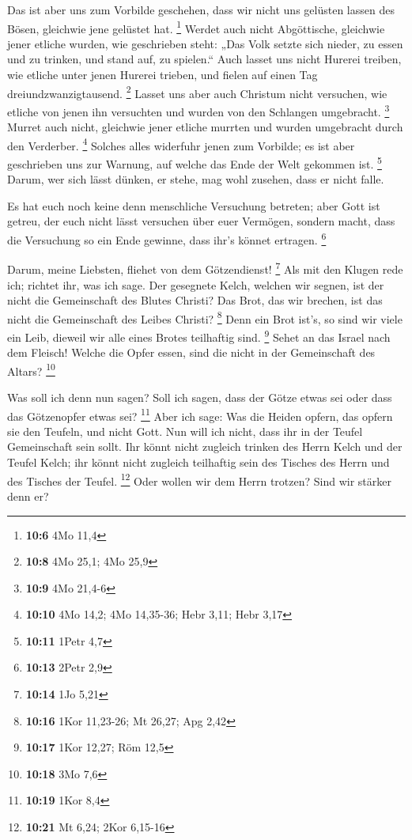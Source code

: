  Das ist aber uns zum Vorbilde geschehen, dass wir nicht uns
gelüsten lassen des Bösen, gleichwie jene gelüstet hat. \footnote{\textbf{10:6}
  4Mo 11,4}  Werdet auch nicht Abgöttische, gleichwie jener
etliche wurden, wie geschrieben steht: „Das Volk setzte sich nieder, zu
essen und zu trinken, und stand auf, zu spielen.``  Auch
lasset uns nicht Hurerei treiben, wie etliche unter jenen Hurerei
trieben, und fielen auf einen Tag dreiundzwanzigtausend. \footnote{\textbf{10:8}
  4Mo 25,1; 4Mo 25,9}  Lasset uns aber auch Christum nicht
versuchen, wie etliche von jenen ihn versuchten und wurden von den
Schlangen umgebracht. \footnote{\textbf{10:9} 4Mo 21,4-6} 
Murret auch nicht, gleichwie jener etliche murrten und wurden umgebracht
durch den Verderber. \footnote{\textbf{10:10} 4Mo 14,2; 4Mo 14,35-36;
  Hebr 3,11; Hebr 3,17}  Solches alles widerfuhr jenen zum
Vorbilde; es ist aber geschrieben uns zur Warnung, auf welche das Ende
der Welt gekommen ist. \footnote{\textbf{10:11} 1Petr 4,7} 
Darum, wer sich lässt dünken, er stehe, mag wohl zusehen, dass er nicht
falle.

 Es hat euch noch keine denn menschliche Versuchung
betreten; aber Gott ist getreu, der euch nicht lässt versuchen über euer
Vermögen, sondern macht, dass die Versuchung so ein Ende gewinne, dass
ihr's könnet ertragen. \footnote{\textbf{10:13} 2Petr 2,9}

 Darum, meine Liebsten, fliehet von dem Götzendienst!
\footnote{\textbf{10:14} 1Jo 5,21}  Als mit den Klugen rede
ich; richtet ihr, was ich sage.  Der gesegnete Kelch,
welchen wir segnen, ist der nicht die Gemeinschaft des Blutes Christi?
Das Brot, das wir brechen, ist das nicht die Gemeinschaft des Leibes
Christi? \footnote{\textbf{10:16} 1Kor 11,23-26; Mt 26,27; Apg 2,42}
 Denn ein Brot ist's, so sind wir viele ein Leib, dieweil
wir alle eines Brotes teilhaftig sind. \footnote{\textbf{10:17} 1Kor
  12,27; Röm 12,5}  Sehet an das Israel nach dem Fleisch!
Welche die Opfer essen, sind die nicht in der Gemeinschaft des Altars?
\footnote{\textbf{10:18} 3Mo 7,6}

 Was soll ich denn nun sagen? Soll ich sagen, dass der
Götze etwas sei oder dass das Götzenopfer etwas sei? \footnote{\textbf{10:19}
  1Kor 8,4}  Aber ich sage: Was die Heiden opfern, das
opfern sie den Teufeln, und nicht Gott. Nun will ich nicht, dass ihr in
der Teufel Gemeinschaft sein sollt.  Ihr könnt nicht
zugleich trinken des Herrn Kelch und der Teufel Kelch; ihr könnt nicht
zugleich teilhaftig sein des Tisches des Herrn und des Tisches der
Teufel. \footnote{\textbf{10:21} Mt 6,24; 2Kor 6,15-16} 
Oder wollen wir dem Herrn trotzen? Sind wir stärker denn er?

